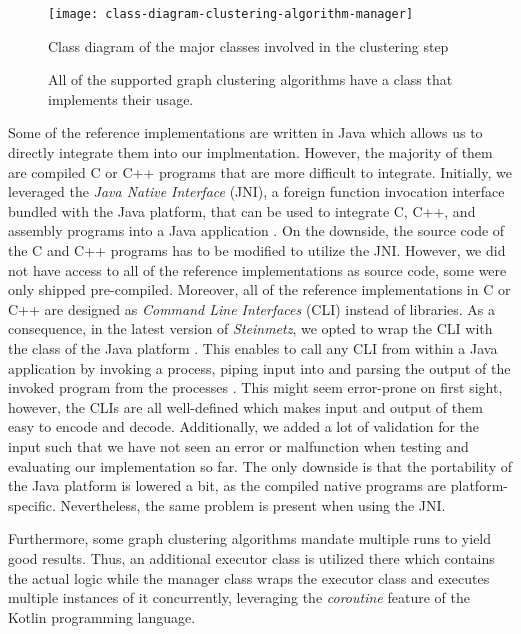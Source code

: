 \documentclass[12pt,a4paper]{report}
\begin{document}
\begin{figure}[htbp]
\centering
\texttt{[image: class-diagram-clustering-algorithm-manager]}
\caption{Class diagram of the major classes involved in the clustering step}
\caption*{\centering
  All of the supported graph clustering algorithms have a class that implements
  their usage.
}
\label{fig:class-diagram-clustering-algorithm-manager}
\end{figure}

Some of the reference implementations are written in Java which allows us to directly
integrate them into our implmentation. However, the majority of them are compiled C or
C++ programs that are more difficult to integrate.
Initially, we leveraged the \textit{Java Native Interface} (JNI), a foreign function
invocation interface bundled with the Java platform, that can be used to integrate
C, C++, and assembly programs into a Java application \cite{jni}.
On the downside, the source code of the C and C++ programs has to be modified to utilize
the JNI. However, we did not have access to all of the reference implementations as source
code, some were only shipped pre-compiled.
Moreover, all of the reference implementations in C or C++ are designed as
\textit{Command Line Interfaces} (CLI) instead of libraries.
As a consequence, in the latest version of \textit{Steinmetz}, we opted to wrap the
CLI with the  class of the Java platform \cite{process-builder}.
This enables to call any CLI from within a Java application by invoking a process,
piping input into  and parsing the output of the invoked program from
the processes . This might seem error-prone on first sight, however,
the CLIs are all well-defined which makes input and output of them easy to
encode and decode.
Additionally, we added a lot of validation for the input such that we have not seen
an error or malfunction when testing and evaluating our implementation so far.
The only downside is that the portability of the Java platform is lowered a bit,
as the compiled native programs are platform-specific. Nevertheless, the same problem
is present when using the JNI.

Furthermore, some graph clustering algorithms mandate multiple runs to yield good results.
Thus, an additional executor class is utilized there which contains the actual logic while
the manager class wraps the executor class and executes multiple instances of it concurrently,
leveraging the \textit{coroutine} feature of the Kotlin programming language.
\end{document}
